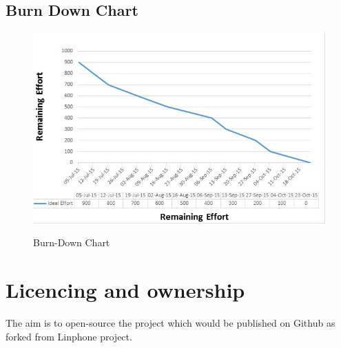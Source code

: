 \documentclass[a4paper]{article}
\begin{document}
\subsection{Burn Down Chart}
\begin{figure}[H]
\includegraphics[width=1\linewidth]{./pictures/burnDown.jpg}\\
\caption{\label{fig:Burn-down chart}Burn-Down Chart}
\end{figure}
\newpage

\section{Licencing and ownership}
The aim is to open-source the project which would be published on Github as forked from Linphone project. 
\end{document}
